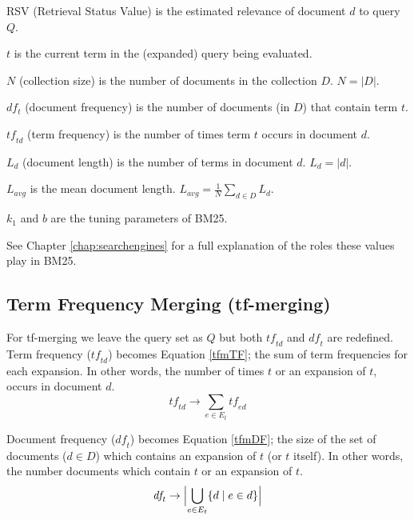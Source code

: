 \noindent
RSV (Retrieval Status Value) is the estimated relevance of document $d$ to query $Q$.

\noindent
$t$ is the current term in the (expanded) query being evaluated.

\noindent
$N$ (collection size) is the number of documents in the collection $D$. $N = |D|$.

\noindent
$df_t$ (document frequency) is the number of documents (in $D$) that contain term $t$.

\noindent
$\mathit{tf}_{\!td}$ (term frequency) is the number of times term $t$ occurs in document $d$.

\noindent
$L_d$ (document length) is the number of terms in document $d$. $L_d = |d|$.

\noindent
$L_{avg}$ is the mean document length. $L_{avg} = \frac{1}{N}\sum_{d \in D} L_d $.

\noindent
$k_1$ and $b$ are the tuning parameters of BM25.

\noindent
See Chapter \ref{chap:searchengines} for a full explanation of the roles these values play in BM25.

\newpage
\subsection{Term Frequency Merging (tf-merging)}
For tf-merging we leave the query set as $Q$ but both $\mathit{tf}_{\!td}$ and $\mathit{df}_{\!t}$ are redefined.
Term frequency ($\mathit{tf}_{\!td}$) becomes Equation \eqref{tfmTF}; the sum of term frequencies for each expansion. In other words, the number of times $t$ or an expansion of $t$, occurs in document $d$.
\begin{equation}\label{tfmTF}
	\mathit{tf}_{\!td} \rightarrow \sum_{e \in E_t} \mathit{tf}_{\!ed}
\end{equation}

Document frequency ($\mathit{df}_{\!t}$) becomes Equation \eqref{tfmDF}; the size of the set of documents ($d \in D$) which contains an expansion of $t$ (or $t$ itself). In other words, the number documents which contain $t$ or an expansion of $t$.
\begin{equation}\label{tfmDF}
	\mathit{df}_{\!t} \rightarrow \Bigl| \bigcup_{e \in E_t} \{ d \mid e \in d \} \Bigr|
\end{equation}


